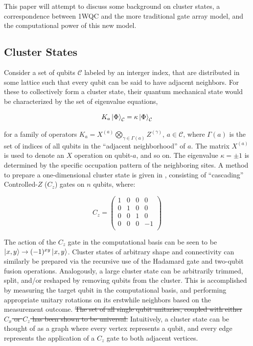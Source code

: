 \documentclass[twocolumn]{IEEEtran11}
\newcommand{\clb}{\color{blue}}
\newcommand{\clr}{\color{myRed}}
\newcommand{\clbl}{\color{black}}
\begin{document}
This paper will attempt to discuss some background on cluster states, a correspondence between 1WQC and the more traditional gate array model, and the computational power of this new model.

\subsection{Cluster States}
\clb Consider a set of qubits $\mathcal{C}$ labeled by an interger index, that are distributed in some lattice such that every qubit can be said to have adjacent neighbors. For these to collectively form a cluster state, their quantum mechanical state would be characterized by the set of eigenvalue equations\cite{briegel2001persistent},

\begin{equation}
  K_a\left|\mspace{0.5mu} \Phi \mspace{0.5mu}\right\rangle_{\mathcal{C}}= \kappa\left|\mspace{0.5mu} \Phi \mspace{0.5mu}\right\rangle_{\mathcal{C}}
\end{equation}

\noindent for a family of operators $K_a = X^{(a)}\bigotimes_{\gamma\in\Gamma(a)}Z^{(\gamma)}$, $a\in\mathcal{C}$, where $\Gamma(a)$ is the set of indices of all qubits in the ``adjacent neighborhood'' of $a$. The matrix $X^{(a)}$ is used to denote an $X$ operation on qubit-$a$, and so on. The eigenvalue $\kappa = \pm 1$ is determined by the specific occupation pattern of the neighboring sites. \clbl A method to prepare a one-dimensional cluster state is given in \cite{jorrand2005unifying}, consisting of ``cascading'' Controlled-$Z$ ($C_z$) gates on $n$ qubits, where:

\[
C_z = 
\begin{pmatrix}
  1 & 0 & 0 & 0 \\
  0 & 1 & 0 & 0 \\
  0 & 0 & 1 & 0 \\
  0 & 0 & 0 & -1 \\
 \end{pmatrix}
\]

The action of the $C_z$ gate in the computational basis can be seen to be $\left|\mspace{0.5mu} x,y \mspace{0.5mu}\right\rangle \to (-1)^{xy}\left|\mspace{0.5mu} x,y \mspace{0.5mu}\right\rangle$. \clb Cluster states of arbitrary shape and connectivity can similarly be prepared via the recursive use of the Hadamard gate and two-qubit fusion operations\cite{browne2005efficient,gerald2006efficient}. Analogously, a large cluster state can be arbitrarily trimmed, split, and/or reshaped by removing qubits from the cluster. This is accomplished by measuring the target qubit in the computational basis, and performing appropriate unitary rotations on its erstwhile neighbors based on the measurement outcome. \clr \sout{The set of all single qubit unitaries, coupled with either $C_x$ or $C_z$ has been shown to be universal\cite{brylinski2002universal}.} \clbl Intuitively, a cluster state can be thought of as a graph where every vertex represents a qubit, and every edge represents the application of a $C_z$ gate to both adjacent vertices.
\end{document}
